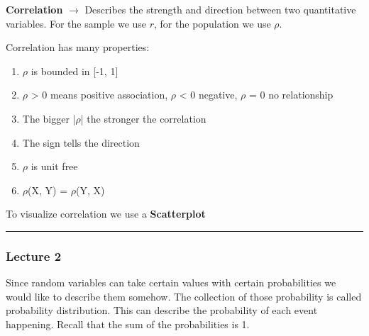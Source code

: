 \vspace{10pt}

\textbf{Correlation} $\xrightarrow{}$ Describes the strength and direction between two quantitative variables. For the sample we use $r$, for the population we use $\rho$.

\vspace{10pt}

Correlation has many properties:
\begin{enumerate}
    \item $\rho$ is bounded in [-1, 1]
    \item $\rho$ > 0 means positive association, $\rho$ < 0 negative, $\rho$ = 0 no relationship
    \item The bigger |$\rho$| the stronger the correlation
    \item The sign tells the direction
    \item $\rho$ is unit free
    \item $\rho$(X, Y) = $\rho$(Y, X)
    
\end{enumerate}

To visualize correlation we use a \textbf{Scatterplot}



\hrule

\subsubsection{Lecture 2}

\vspace{10pt}

Since random variables can take certain values with certain probabilities we would like to describe them somehow. The collection of those probability is called probability distribution. This can describe the probability of each event happening. Recall that the sum of the probabilities is 1.

